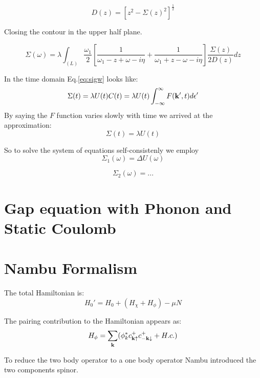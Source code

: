 \documentclass{article}
\def\k{{\bf k}}
\def\ckp{c^{+}_{\k\uparrow}}
\def\cmkp{c^{+}_{-\k\downarrow}}
\begin{document}
\begin{equation}
D(z) =  \left[z^{2} - \Sigma(z)^{2} \right]^{\frac{1}{2}}
\end{equation}

Closing the contour in the upper half plane.

\begin{equation}
\label{eq:sigw}
\Sigma(\omega) = \lambda \int_{(L)} \frac{\omega_{1}}{2} \left[ \frac{1}{\omega_{1} - z + \omega - i\eta} 
+ \frac{1}{\omega_{1} + z - \omega - i\eta} \right] \frac{\Sigma(z)}{2D(z)} dz
\end{equation}

In the time domain Eq.\ref{eq:sigw} looks like:
%
\begin{equation}
\Sigma(t) = \lambda U(t) C(t) = \lambda U(t) \int_{-\infty}^{\infty}F(\k',t)d\epsilon' 
\end{equation}
%
By saying the $F$ function varies slowly with time we arrived at the approximation:
%
\begin{equation}
\Sigma(t) = \lambda U(t)
\end{equation}

So to solve the system of equations self-consistenly we employ
%
\begin{equation}
\Sigma_{1}(\omega) = \Delta U(\omega)
\end{equation}

\begin{equation}
\Sigma_{2}(\omega) = ...
\end{equation}


\section{Gap equation with Phonon and Static Coulomb}

\section{Nambu Formalism}
The total Hamiltonian is:
%
\begin{equation}
H_{0}'= H_{0} + (H_{\chi} + H_{\phi}) - \mu N
\end{equation}
%

The pairing contribution to the Hamiltonian appears as:
%
\begin{equation}
H_{\phi} = \sum_{\k}(\phi^{*}_{k}\ckp\cmkp  + H.c. )
\end{equation}
%

To reduce the two body operator to a one body operator Nambu introduced the two components spinor.
\end{document}

